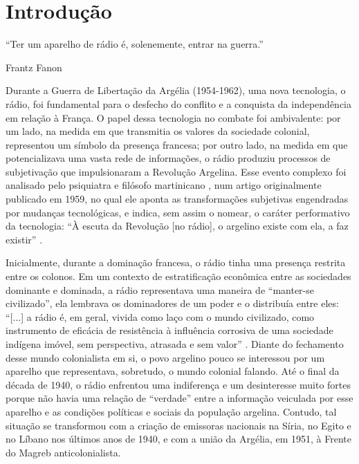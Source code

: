 \documentclass[portuguese]{textolivre}
\begin{document}
\begin{polyabstract}
\begin{english}
\begin{abstract}
\end{abstract}
\end{english}
\end{polyabstract}

\section{Introdução}\label{sec-intro}

\epigraph{“Ter um aparelho de rádio é, solenemente, entrar na guerra.”}{Frantz Fanon}


Durante a Guerra de Libertação da Argélia (1954-1962), uma nova tecnologia, o rádio, foi fundamental para o desfecho do conflito e a conquista da independência em relação à França. O papel dessa tecnologia no combate foi ambivalente: por um lado, na medida em que transmitia os valores da sociedade colonial, representou um símbolo da presença francesa; por outro lado, na medida em que potencializava uma vasta rede de informações, o rádio produziu processos de subjetivação que impulsionaram a Revolução Argelina. Esse evento complexo foi analisado pelo psiquiatra e filósofo martinicano \textcite{fanon2021argelia}, num artigo originalmente publicado em 1959, no qual ele aponta as transformações subjetivas engendradas por mudanças tecnológicas, e indica, sem assim o nomear, o caráter performativo da tecnologia: “À escuta da Revolução [no rádio], o argelino existe com ela, a faz existir” \cite[p. 692]{fanon2021argelia}.

Inicialmente, durante a dominação francesa, o rádio tinha uma presença restrita entre os colonos. Em um contexto de estratificação econômica entre as sociedades dominante e dominada, a rádio representava uma maneira de “manter-se civilizado”, ela lembrava os dominadores de um poder e o distribuía entre eles: “[...] a rádio é, em geral, vivida como laço com o mundo civilizado, como instrumento de eficácia de resistência à influência corrosiva de uma sociedade indígena imóvel, sem perspectiva, atrasada e sem valor” \cite[p. 679]{fanon2021argelia}. Diante do fechamento desse mundo colonialista em si, o povo argelino pouco se interessou por um aparelho que representava, sobretudo, o mundo colonial falando. Até o final da década de 1940, o rádio enfrentou uma indiferença e um desinteresse muito fortes porque não havia uma relação de “verdade” entre a informação veiculada por esse aparelho e as condições políticas e sociais da população argelina. Contudo, tal situação se transformou com a criação de emissoras nacionais na Síria, no Egito e no Líbano nos últimos anos de 1940, e com a união da Argélia, em 1951, à Frente do Magreb anticolonialista.
\end{document}
